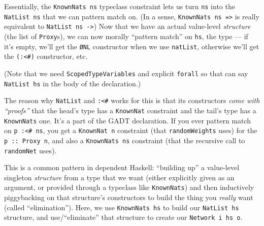 \documentclass[]{article}
\newenvironment{Shaded}{}{}
\newcommand{\KeywordTok}[1]{\textcolor[rgb]{0.00,0.44,0.13}{\textbf{{#1}}}}
\newcommand{\DataTypeTok}[1]{\textcolor[rgb]{0.56,0.13,0.00}{{#1}}}
\newcommand{\CommentTok}[1]{\textcolor[rgb]{0.38,0.63,0.69}{\textit{{#1}}}}
\newcommand{\OtherTok}[1]{\textcolor[rgb]{0.00,0.44,0.13}{{#1}}}
\newcommand{\FunctionTok}[1]{\textcolor[rgb]{0.02,0.16,0.49}{{#1}}}
\newcommand{\NormalTok}[1]{{#1}}
\begin{document}
Essentially, the \texttt{KnownNats\ ns} typeclass constraint lets us turn
\texttt{ns} into the \texttt{NatList\ ns} that we can pattern match on. (In a
sense, \texttt{KnownNats\ ns\ =\textgreater{}} is really equivalent to
\texttt{NatList\ ns\ -\textgreater{}}) Now that we have an actual value-level
\emph{structure} (the list of \texttt{Proxy}s), we can now morally ``pattern
match'' on \texttt{hs}, the type --- if it's empty, we'll get the \texttt{ØNL}
constructor when we use \texttt{natList}, otherwise we'll get the
\texttt{(:\textless{}\#)} constructor, etc.

\begin{Shaded}
\end{Shaded}

(Note that we need \texttt{ScopedTypeVariables} and explicit \texttt{forall} so
that can say \texttt{NatList\ hs} in the body of the declaration.)

The reason why \texttt{NatList} and \texttt{:\textless{}\#} works for this is
that its constructors \emph{come with ``proofs''} that the head's type has a
\texttt{KnownNat} constraint and the tail's type has a \texttt{KnownNats} one.
It's a part of the GADT declaration. If you ever pattern match on
\texttt{p\ :\textless{}\#\ ns}, you get a \texttt{KnownNat\ n} constraint (that
\texttt{randomWeights} uses) for the \texttt{p\ ::\ Proxy\ n}, and also a
\texttt{KnownNats\ ns} constraint (that the recursive call to \texttt{randomNet}
uses).

This is a common pattern in dependent Haskell: ``building up'' a value-level
singleton \emph{structure} from a type that we want (either explicitly given as
an argument, or provided through a typeclass like \texttt{KnownNats}) and then
inductively piggybacking on that structure's constructors to build the thing you
\emph{really} want (called ``elimination''). Here, we use \texttt{KnownNats\ hs}
to build our \texttt{NatList\ hs} structure, and use/``eliminate'' that
structure to create our \texttt{Network\ i\ hs\ o}.
\end{document}

